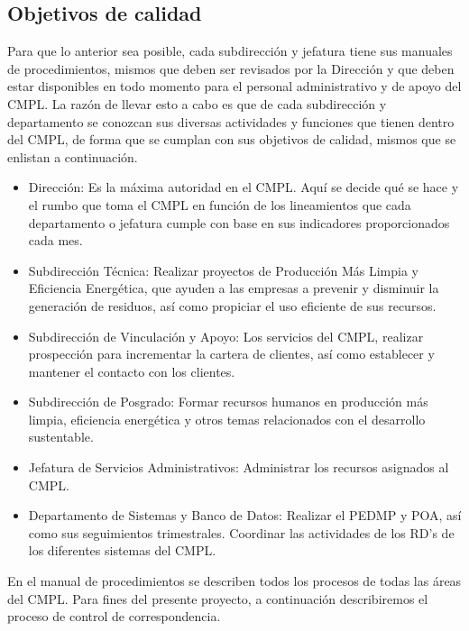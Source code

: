 	\subsection{Objetivos de calidad}
	Para que lo anterior sea posible, cada subdirección y jefatura tiene sus manuales de procedimientos, mismos que deben ser revisados por la Dirección y que deben estar disponibles en todo momento para el personal administrativo y de apoyo del CMPL. La razón de llevar esto a cabo es que de cada subdirección y departamento se conozcan sus diversas actividades y funciones que tienen dentro del CMPL, de forma que se cumplan con sus objetivos de calidad, mismos que se enlistan a continuación.\\
	
	\begin{itemize}
		\item Dirección: Es la máxima autoridad en el CMPL. Aquí se decide qué se hace y el rumbo que toma el CMPL en función de los lineamientos que cada departamento o jefatura cumple con base en sus indicadores proporcionados cada mes.
		\item Subdirección Técnica: Realizar proyectos de Producción Más Limpia y Eficiencia Energética, que  ayuden a las empresas a prevenir y disminuir la generación de residuos, así como propiciar el uso eficiente de sus recursos. \cite{SIGTecnica}
		\item Subdirección de Vinculación y Apoyo: Los servicios del CMPL, realizar prospección para incrementar la cartera de clientes, así como establecer y mantener el contacto con los clientes. \cite{SIGVinculacion}
		\item Subdirección de Posgrado: Formar recursos humanos en producción más limpia, eficiencia energética y otros temas relacionados con el desarrollo sustentable. \cite{SIGPosgrado}
		\item Jefatura de Servicios Administrativos: Administrar los recursos asignados al CMPL. \cite{SIGAdministrativa}
		\item Departamento de Sistemas y Banco de Datos: Realizar el PEDMP y POA, así como sus seguimientos trimestrales. Coordinar las actividades de los RD's de los diferentes sistemas del CMPL. \cite{SIGSistemas}
	\end{itemize}
	
	En el manual de procedimientos se describen todos los procesos de todas las áreas del CMPL. Para fines del presente proyecto, a continuación describiremos el proceso de control de correspondencia.
	
